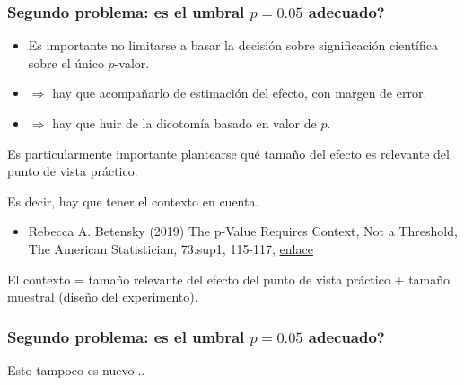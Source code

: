 \documentclass[9pt]{beamer}
\begin{document}
  \begin{frame}
    \frametitle{Segundo problema: es el umbral $p = 0.05$ adecuado?}
    \begin{itemize}
    \item<+-> Es importante no limitarse a basar la decisión sobre
      significación científica sobre el único $p$-valor.
    \item<+-> $\Rightarrow$ hay que acompañarlo de estimación del
      efecto, con margen de error.
     \item<+-> $\Rightarrow$ hay que huir de la dicotomía basado en
       valor de $p$. 
     \end{itemize}\onslide<+->
     \begin{block}{}
       Es particularmente importante plantearse qué tamaño del efecto
       es relevante del punto de vista práctico.
     \end{block}\onslide<+->
     Es decir, hay que tener el contexto en cuenta.\onslide<+->
     \begin{itemize}
     \item      Rebecca A. Betensky (2019) The p-Value Requires Context, Not a Threshold, The American Statistician, 73:sup1, 115-117, \href{https://doi.org/10.1080/00031305.2018.1529624}{enlace}
     \end{itemize}
\onslide<+-> El contexto = tamaño relevante del efecto del punto de
vista práctico + tamaño muestral (diseño del experimento).
\end{frame}
  \begin{frame}
    \frametitle{Segundo problema: es el umbral $p = 0.05$ adecuado?}
    Esto tampoco es nuevo...
    \begin{center}
    \end{center}
\end{frame}
\end{document}
